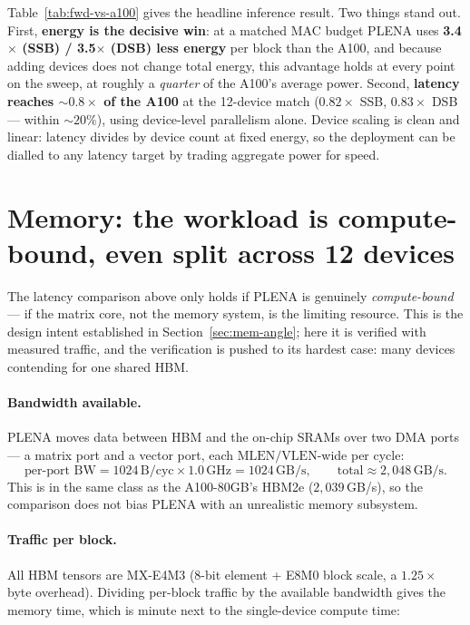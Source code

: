 \documentclass[11pt]{report}
\begin{document}
Table~\ref{tab:fwd-vs-a100} gives the headline inference result. Two things
stand out. First, \textbf{energy is the decisive win}: at a matched MAC
budget PLENA uses \textbf{3.4$\times$ (SSB) / 3.5$\times$ (DSB) less energy}
per block than the A100, and because adding devices does not change total
energy, this advantage holds at every point on the sweep, at roughly a
\emph{quarter} of the A100's average power. Second, \textbf{latency reaches
${\sim}0.8\times$ of the A100} at the 12-device match ($0.82\times$ SSB,
$0.83\times$ DSB --- within ${\sim}20\%$), using device-level parallelism
alone. Device scaling is clean and linear: latency divides by device count
at fixed energy, so the deployment can be dialled to any latency target by
trading aggregate power for speed.

\section{Memory: the workload is compute-bound, even split across 12 devices}
\label{sec:results-memory}

The latency comparison above only holds if PLENA is genuinely
\emph{compute-bound} --- if the matrix core, not the memory system, is the
limiting resource. This is the design intent established in
Section~\ref{sec:mem-angle}; here it is verified with measured traffic, and
the verification is pushed to its hardest case: many devices contending for
one shared HBM.

\paragraph{Bandwidth available.} PLENA moves data between HBM and the
on-chip SRAMs over two DMA ports --- a matrix port and a vector port, each
$\text{MLEN}/\text{VLEN}$-wide per cycle:
\[
\text{per-port BW} = 1024\,\text{B/cyc}\times1.0\,\text{GHz} = 1024\,\text{GB/s},
\qquad \text{total} \approx 2{,}048\,\text{GB/s}.
\]
This is in the same class as the A100-80GB's HBM2e ($2{,}039$\,GB/s), so the
comparison does not bias PLENA with an unrealistic memory subsystem.

\paragraph{Traffic per block.} All HBM tensors are MX-E4M3 (8-bit element +
E8M0 block scale, a $1.25\times$ byte overhead). Dividing per-block traffic
by the available bandwidth gives the memory time, which is minute next to
the single-device compute time:
\end{document}
